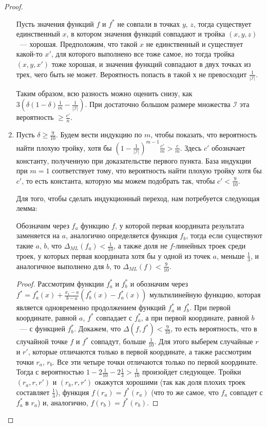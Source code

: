 \documentclass[12pt,fleqn,a4paper]{book}
\begin{document}
\begin{proof}
\begin{enumerate}
		Пусть значения функций $f$ и $f^*$ не совпали в точках $y$, $z$, тогда существует единственный $x$, в котором значения 
		функций совпадают и тройка $(x,y,z)$~--- хорошая. Предположим, что такой $x$ не единственный и существует какой-то $x'$, 
		для которого выполнено все тоже самое, но тогда тройка $(x,y,x')$ тоже хорошая, и значения функций совпадают в двух точках из трех, 
		чего быть не может. Вероятность попасть в такой $х$ не превосходит $\frac{1}{|\mathcal{I}|}$.
		
		Таким образом, всю разность можно оценить снизу, как $3(\delta(1-\delta)\frac{1}{m} - \frac{1}{|\mathcal{I}|})$. 
		При достаточно большом размере множества $\mathcal{I}$ эта вероятность $\ge \frac{c'}{n}$.
		 
		\item Пусть $\delta \ge \frac{9}{10}$. Будем вести индукцию по $m$, чтобы показать, что вероятность найти плохую тройку, хотя бы
		 $(1 - \frac{1}{|\mathcal{I}|})^{m-1} \frac{c'}{m} > \frac{c}{m}$. Здесь $c'$ обозначает константу, полученную 
		 при доказательстве первого пункта.
		 База индукции при $m=1$ соответствует тому, что вероятность найти плохую тройку хотя бы $c'$, то есть константа, 
		 которую мы можем подобрать так, чтобы $c' < \frac{9}{10}$.
		 
		 Для того, чтобы сделать индукционный переход, нам потребуется следующая лемма:
		 \begin{lemma}
		    Обозначим через $f_a$ функцию $f$, у которой первая координата результата заменяется на $a$, аналогично определяется 
		    функция $f_b$, тогда
			если существуют такие $a$, $b$, что $\Delta_{ML}(f_a) < \frac{1}{10}$, а также
			доля не $f$-линейных троек среди троек, у которых первая координата хотя бы у одной из точек $a$, меньше $\frac{1}{3}$,
			и аналогичное выполнено для $b$, то $\Delta_{ML}(f) < \frac{9}{10}$.
		 \end{lemma}
		 \begin{proof}
			Рассмотрим функции $f^*_a$ и $f^*_b$ и обозначим через \\ 
			$f^* = f^*_a(x) + \frac{x_1-a}{b-a} (f^*_b(x) -f^*_a(x))$ мультилинейную функцию, которая является одновременно продолжением 
			функций $f^*_a$  и $f^*_b$. При первой координате, равной $a$, $f^*$ совпадает с $f^*_a$, а при первой координате, 
			равной $b$~--- с функцией $f^*_b$.
			Докажем, что $\Delta(f,f^*) < \frac{9}{10}$, то есть вероятность, что в случайной точке $f$ и $f^*$ 
			совпадут, больше $ \frac{1}{10}$. Для этого выберем случайные $r$ и $r'$, которые отличаются только в первой координате, а также 
			рассмотрим точки $r_a$, $r_b$. Все эти четыре точки отличаются только по первой координате.
			Тогда с вероятностью $1 - 2 \frac{1}{10} - 2 \frac{1}{3} > \frac{1}{10}$ произойдет следующее.
			Тройки $(r_a,r,r')$ и $(r_b,r,r')$ окажутся хорошими (так как доля плохих троек составляет $\frac{1}{3}$),
			функция $f(r_a) = f^*(r_a)$ (что то же самое, что $f_a$ совпадет с $f^*_a$ в $r_a$) и, аналогично,
			$f(r_b) = f^*(r_b)$.
		 \end{proof}
		 

\end{enumerate}
\end{proof}
\end{document}
